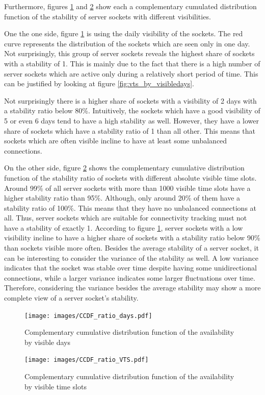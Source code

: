 Furthermore, figures \ref{fig:ccdf_ratio_days} and \ref{fig:ccdf_ratio_vts} show each a complementary cumulated distribution function of the stability of server sockets with different visibilities.

One the one side, figure \ref{fig:ccdf_ratio_days} is using the daily visibility of the sockets. 
The red curve represents the distribution of the sockets which are seen only in one day. 
Not surprisingly, this group of \glspl{server socket} reveals the highest share of sockets with a stability of 1. 
This is mainly due to the fact that there is a high number of \glspl{server socket} which are active only during a relatively short period of time. This can be justified by looking at figure \ref{fig:vts_by_visibledays}.

Not surprisingly there is a higher share of sockets with a visibility of 2 days with a stability ratio below 80\%. 
Intuitively, the sockets which have a good visibility of 5 or even 6 days tend to have a high stability as well. However, they have a lower share of sockets which have a stability ratio of 1 than all other. 
This means that sockets which are often visible incline to have at least some unbalanced connections.

On the other side, figure \ref{fig:ccdf_ratio_vts} shows the complementary cumulative distribution function of the stability ratio of sockets with different absolute visible time slots. 
Around 99\% of all \glspl{server socket} with more than 1000 visible time slots have a higher stability ratio than 95\%. 
Although, only around 20\% of them have a stability ratio of 100\%. This means that they have no unbalanced connections at all. 
Thus, server sockets which are suitable for connectivity tracking must not have a stability of exactly 1. 
According to figure \ref{fig:ccdf_ratio_days}, \glspl{server socket} with a low visibility incline to have a higher share of sockets with a stability ratio below 90\% than sockets visible more often.
Besides the average stability of a server socket, it can be interesting to consider the variance of the stability as well. 
A low variance indicates that the socket was stable over time despite having some unidirectional connections, while a larger variance indicates some larger fluctuations over time. 
Therefore, considering the variance besides the average stability may show a more complete view of a \gls{server socket}'s stability.  

\begin{landscape}
	\begin{figure}
		[p] \centering 
		\texttt{[image: images/CCDF\_ratio\_days.pdf]} \caption{Complementary cumulative distribution function of the availability by visible days} 
		\label{fig:ccdf_ratio_days} 
	\end{figure}
\end{landscape}
\begin{landscape}
	\begin{figure}
		[p] \centering 
		\texttt{[image: images/CCDF\_ratio\_VTS.pdf]} \caption{Complementary cumulative distribution function of the availability by visible time slots} 
		\label{fig:ccdf_ratio_vts} 
	\end{figure}
\end{landscape}

